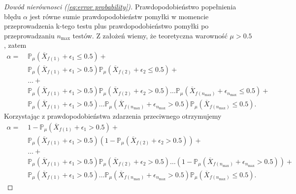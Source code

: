 \documentclass[inzynierska]{pwr_wmat_praca_dyplomowa}
\theoremstyle{plain}
\numberwithin{theorem}{chapter}
\theoremstyle{definition}
\numberwithin{theorem}{chapter}
\newcommand{\probP}{\mathbb{P}}
\newcommand{\nmax}{n_{\text{max}}}
\begin{document}
\begin{proof}[Dowód nierównosci (\ref{eq:error probability})]\label{proof:error probability}
	 Prawdopodobieństwo popełnienia błędu $\alpha$ jest równe sumie prawdopodobieństw pomyłki w momencie przeprowadzenia k-tego testu plus prawdopodobieństwo pomyłki po przeprowadzaniu $\nmax$ testów. Z założeń wiemy, że teoretyczna warowność $\mu > 0.5$, zatem
	\begin{align*}
		\alpha=\;
		&\probP_{\mu}(\overline{X}_{f(1)} + \epsilon_{1} \le 0.5) + \\
		&\probP_{\mu}(\overline{X}_{f(1)} + \epsilon_{1} > 0.5)\probP_{\mu}(\overline{X}_{f(2)} + \epsilon_{2} \le 0.5) +\\
		&\dots +\\
		&\probP_{\mu}(\overline{X}_{f(1)} + \epsilon_{1} > 0.5)\probP_{\mu}(\overline{X}_{f(2)} + \epsilon_{2} > 0.5)\dots  \probP_{\mu}(\overline{X}_{f(\nmax)}+ \epsilon_{\nmax} \le 0.5)+\\
		&\probP_{\mu}(\overline{X}_{f(1)} + \epsilon_{1} > 0.5)\dots  \probP_{\mu}(\overline{X}_{f(\nmax)}+ \epsilon_{\nmax} > 0.5)\probP_{\mu}(\overline{X}_{f(\nmax)} \le 0.5).
	\end{align*}
	Korzystając z prawdopodobieństwa zdarzenia przeciwnego otrzymujemy
	\begin{align*}
		\alpha=\;
		&1 - \probP_{\mu}(\overline{X}_{f(1)} + \epsilon_{1} > 0.5) + \\
		&\probP_{\mu}(\overline{X}_{f(1)} + \epsilon_{1} > 0.5)(1 - \probP_{\mu}(\overline{X}_{f(2)} + \epsilon_{2} > 0.5)) +\\
		&\dots +\\
		&\probP_{\mu}(\overline{X}_{f(1)} + \epsilon_{1} > 0.5)\probP_{\mu}(\overline{X}_{f(2)} + \epsilon_{2} > 0.5)\dots  (1-\probP_{\mu}(\overline{X}_{f(\nmax)}+ \epsilon_{\nmax} > 0.5))+\\
		&\probP_{\mu}(\overline{X}_{f(1)} + \epsilon_{1} > 0.5)\dots  \probP_{\mu}(\overline{X}_{f(\nmax)}+ \epsilon_{\nmax} > 0.5)\probP_{\mu}(\overline{X}_{f(\nmax)} \le 0.5).
	\end{align*}

\end{proof}
\end{document}
